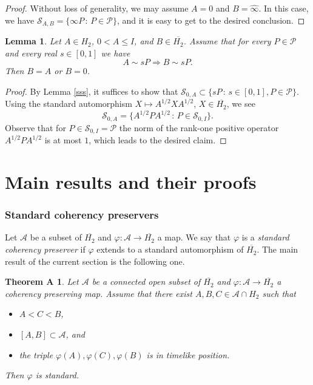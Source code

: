 \documentclass[10pt]{amsart}
\newtheorem{lemma}[theorem]{Lemma}
\newtheorem*{theorema}{Theorem A}
\theoremstyle{definition}
\theoremstyle{remark}
\numberwithin{subsection}{section}
\numberwithin{equation}{section}
\newcommand\oH{{\overline{H_2}}}
\newcommand\oi{{\widehat{\infty}}}
\begin{document}
\begin{proof}
Without loss of generality, we may assume $A=0$ and $B=\oi$. 
In this case, we have $\mathcal{S}_{A, B}=\{\infty P\,:\, P\in \mathcal{P}\}$, and it is easy to get to the desired conclusion.
\end{proof}


\begin{lemma}\label{smtr}
Let $A \in H_2$, $0 < A \le I$, and $B \in \oH$. Assume that for every $P \in \mathcal{P}$ and every real $s \in [0,1]$ we have
\[
A \sim sP \Rightarrow B \sim sP.
\]
Then $B=A$ or $B=0$.
\end{lemma}

\begin{proof}
By Lemma \ref{sss}, it suffices to show that $\mathcal{S}_{0, A}\subset \{sP\,:\, s\in [0,1], P\in \mathcal{P}\}$. 
Using the standard automorphism $X\mapsto A^{1/2} XA^{1/2}$, $X\in \oH$, we see
\[
\mathcal{S}_{0, A}= \{A^{1/2}PA^{1/2}\,:\, P\in \mathcal{S}_{0, I}\}.
\]
Observe that for $P\in \mathcal{S}_{0, I}=\mathcal{P}$ the norm of the rank-one positive operator $A^{1/2}PA^{1/2}$ is at most $1$,
which leads to the desired claim.
\end{proof}







\part{Main results and their proofs}

\section{Standard coherency preservers}\label{standard}
Let $\mathcal{A}$ be a subset of $\oH$ and $\varphi \colon \mathcal{A} \to \oH$ a map.  We say that $\varphi$ is a \emph{standard coherency preserver}  if $\varphi$ extends to a standard automorphism of $\oH$. 
The main result of the current section is the following one.
\begin{theorema}
Let $\mathcal{A}$ be a connected open subset of $\oH$ and $\varphi \colon \mathcal{A} \to \oH$ a coherency preserving map. Assume that there exist $A,B,C \in \mathcal{A}\cap H_2$ such that 
\begin{itemize}
\item $A <C< B$,
\item $[A,B] \subset \mathcal{A}$, and 
\item the triple $\varphi (A), \varphi (C) , \varphi (B)$ is in timelike position.
\end{itemize}
Then $\varphi$ is standard.
\end{theorema}
\end{document}
